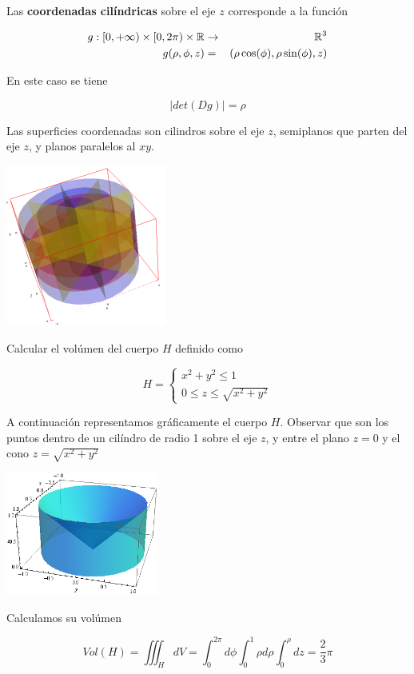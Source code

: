 \begin{definition}[Cilíndricas] 
Las \textbf{coordenadas cilíndricas} sobre el eje $z$ corresponde a la función

\begin{eqnarray*} g : [0, +\infty) \times [0, 2\pi) \times \mathbb{R} &\to& \mathbb{R}^3 \\
g(\rho, \phi, z) &=& ( \rho \cos(\phi), \rho \sin(\phi), z ) \end{eqnarray*}

En este caso se tiene

$$ |det(Dg)| = \rho $$

Las superficies coordenadas son cilindros sobre el eje $z$, semiplanos que parten del eje $z$, y planos paralelos al $xy$.

\begin{center}
\includegraphics{images/04_analisis2/coord_cilind.png}
\end{center}
\end{definition}

\begin{example}
Calcular el volúmen del cuerpo $H$ definido como

$$ H = \begin{cases} x^2 + y^2 \leq 1 \\ 0 \leq z \leq \sqrt{x^2 + y^2} \end{cases} $$

A continuación representamos gráficamente el cuerpo $H$.  Observar que son los puntos dentro de un cilíndro de radio 1 sobre el eje $z$, y entre el plano $z=0$ y el cono $z = \sqrt{x^2 + y^2}$

\begin{center}
\includegraphics[width=5cm]{images/04_analisis2/tp10_ej5f.png}
\end{center}

Calculamos su volúmen

$$ Vol(H) = \iiint_H dV = \int_0^{2\pi} d\phi \int_0^1 \rho d\rho \int_0^{\rho} dz = \frac{2}{3} \pi$$
\end{example}


